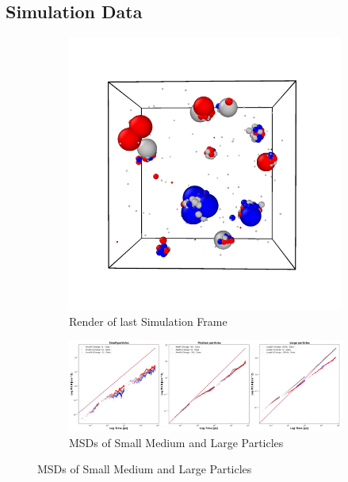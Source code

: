 \documentclass[draft, english]{volcanica-template}
\begin{document}
\subsection{Simulation Data}

\begin{figure}[!htbp]
\centering
\begin{figure}[!htbp]
\centering
\includegraphics[width=0.7\linewidth]{files/LastRender-5d32c7668f5a9b37a6a00d39b10a6ac4.png}
\caption[]{Render of last Simulation Frame}
\label{Fig4_SymTestSys}
\end{figure}

\begin{figure}[!htbp]
\centering
\includegraphics[width=0.7\linewidth]{files/Combined_MSD-bec3420f2d761721ebe7507708701ca9.png}
\caption[]{MSDs of Small Medium and Large Particles}
\label{Fig4_SymTestSys-b}
\end{figure}


\end{figure}
\end{document}
